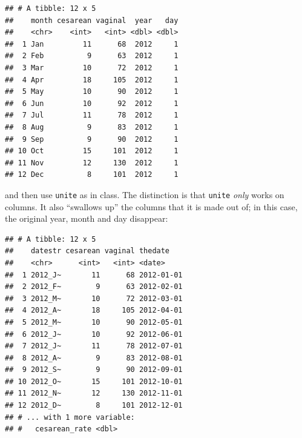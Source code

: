 \documentclass[]{tufte-book}
\newenvironment{Shaded}{}{}
\newcommand{\DataTypeTok}[1]{\textcolor[rgb]{0.56,0.13,0.00}{#1}}
\newcommand{\DecValTok}[1]{\textcolor[rgb]{0.25,0.63,0.44}{#1}}
\newcommand{\KeywordTok}[1]{\textcolor[rgb]{0.00,0.44,0.13}{\textbf{#1}}}
\newcommand{\NormalTok}[1]{#1}
\newcommand{\OperatorTok}[1]{\textcolor[rgb]{0.40,0.40,0.40}{#1}}
\newcommand{\StringTok}[1]{\textcolor[rgb]{0.25,0.44,0.63}{#1}}
\theoremstyle{definition}
\theoremstyle{definition}
\theoremstyle{definition}
\theoremstyle{remark}
\begin{document}
\begin{verbatim}
## # A tibble: 12 x 5
##    month cesarean vaginal  year   day
##    <chr>    <int>   <int> <dbl> <dbl>
##  1 Jan         11      68  2012     1
##  2 Feb          9      63  2012     1
##  3 Mar         10      72  2012     1
##  4 Apr         18     105  2012     1
##  5 May         10      90  2012     1
##  6 Jun         10      92  2012     1
##  7 Jul         11      78  2012     1
##  8 Aug          9      83  2012     1
##  9 Sep          9      90  2012     1
## 10 Oct         15     101  2012     1
## 11 Nov         12     130  2012     1
## 12 Dec          8     101  2012     1
\end{verbatim}

and then use \texttt{unite} as in class. The distinction is that
\texttt{unite} \emph{only} works on columns. It also ``swallows up'' the
columns that it is made out of; in this case, the original year, month
and day disappear:

\begin{Shaded}
\end{Shaded}

\begin{verbatim}
## # A tibble: 12 x 5
##    datestr cesarean vaginal thedate   
##    <chr>      <int>   <int> <date>    
##  1 2012_J~       11      68 2012-01-01
##  2 2012_F~        9      63 2012-02-01
##  3 2012_M~       10      72 2012-03-01
##  4 2012_A~       18     105 2012-04-01
##  5 2012_M~       10      90 2012-05-01
##  6 2012_J~       10      92 2012-06-01
##  7 2012_J~       11      78 2012-07-01
##  8 2012_A~        9      83 2012-08-01
##  9 2012_S~        9      90 2012-09-01
## 10 2012_O~       15     101 2012-10-01
## 11 2012_N~       12     130 2012-11-01
## 12 2012_D~        8     101 2012-12-01
## # ... with 1 more variable:
## #   cesarean_rate <dbl>
\end{verbatim}
\end{document}

